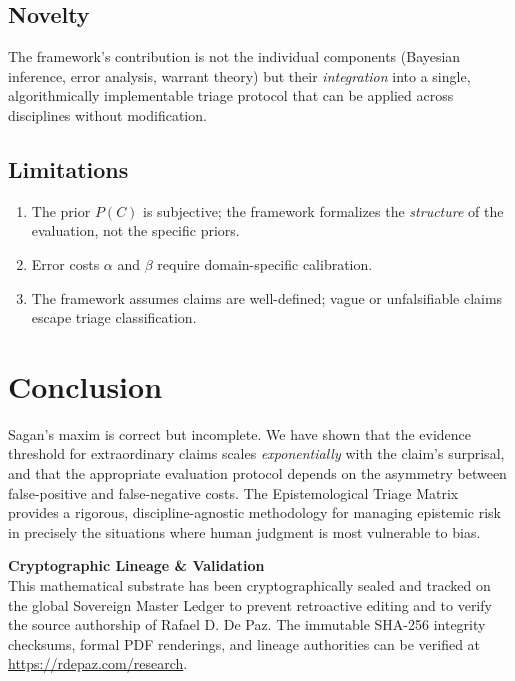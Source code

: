 \documentclass[12pt, a4paper]{article}
\theoremstyle{plain}
\theoremstyle{definition}
\theoremstyle{remark}
\begin{document}
\subsection{Novelty}

The framework's contribution is not the individual components (Bayesian
inference, error analysis, warrant theory) but their \emph{integration}
into a single, algorithmically implementable triage protocol that can
be applied across disciplines without modification.

\subsection{Limitations}
\begin{enumerate}
  \item The prior $P(C)$ is subjective; the framework formalizes the
    \emph{structure} of the evaluation, not the specific priors.
  \item Error costs $\alpha$ and $\beta$ require domain-specific
    calibration.
  \item The framework assumes claims are well-defined; vague or
    unfalsifiable claims escape triage classification.
\end{enumerate}

\section{Conclusion}\label{sec:conclusion}

Sagan's maxim is correct but incomplete. We have shown that the
evidence threshold for extraordinary claims scales \emph{exponentially}
with the claim's surprisal, and that the appropriate evaluation
protocol depends on the asymmetry between false-positive and
false-negative costs. The Epistemological Triage Matrix provides a
rigorous, discipline-agnostic methodology for managing epistemic risk
in precisely the situations where human judgment is most vulnerable
to bias.


\vspace{2em}
\noindent\hrulefill
\vspace{1em}

\noindent\textbf{Cryptographic Lineage \& Validation}\\
This mathematical substrate has been cryptographically sealed and tracked on the global Sovereign Master Ledger to prevent retroactive editing and to verify the source authorship of Rafael D. De Paz. The immutable SHA-256 integrity checksums, formal PDF renderings, and lineage authorities can be verified at \url{https://rdepaz.com/research}.



\end{document}

